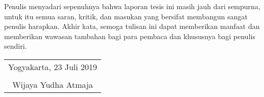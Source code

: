 Penulis menyadari sepenuhnya bahwa laporan tesis ini masih jauh dari sempurna, untuk itu semua saran, kritik, dan masukan yang bersifat membangun sangat penulis harapkan. Akhir kata, semoga tulisan ini dapat memberikan manfaat dan memberikan wawasan tambahan bagi para pembaca dan khususnya bagi penulis sendiri.

\begin{flushright}
	\begin{tabular}{c}
		Yogyakarta, 23 Juli 2019 \\
		\vspace{1cm} \\
		Wijaya Yudha Atmaja
	\end{tabular}
\end{flushright}